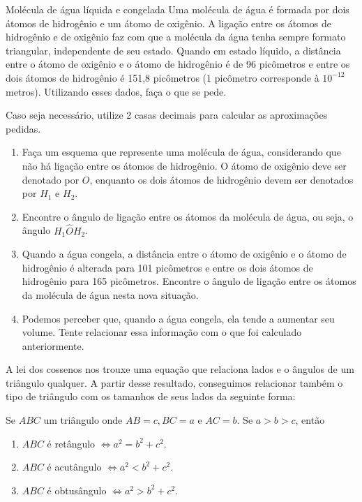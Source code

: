 \begin{task}{Molécula de água líquida e congelada}\label{sec2_leidoscossenos_atquimica}
Uma molécula de água é formada por dois átomos de hidrogênio e um átomo de oxigênio. A ligação entre os átomos de hidrogênio e de oxigênio faz com que a molécula da água tenha sempre formato triangular, independente de seu estado. Quando em estado líquido, a distância entre o átomo de oxigênio e o átomo de hidrogênio é de 96 picômetros e entre os dois átomos de hidrogênio é 151,8 picômetros ($1$ picômetro corresponde à $10^{-12}$ metros). Utilizando esses dados, faça o que se pede.

Caso seja necessário, utilize 2 casas decimais para calcular as aproximações pedidas.

\begin{enumerate}
    \item{}
    Faça um esquema que represente uma molécula de água, considerando que não há ligação entre os átomos de hidrogênio. O átomo de oxigênio deve ser denotado por $O$, enquanto os dois átomos de hidrogênio devem ser denotados por $H_1$ e $H_2$.
    
    \item{}
    Encontre o ângulo de ligação entre os átomos da molécula de água, ou seja, o ângulo $H_1\hat{O}H_2$.
    
    \item{}
    Quando a água congela, a distância entre o átomo de oxigênio e o átomo de hidrogênio é alterada para 101 picômetros e entre os dois átomos de hidrogênio para 165 picômetros. Encontre o ângulo de ligação entre os átomos da molécula de água nesta nova situação.

    \item{}
    Podemos perceber que, quando a água congela, ela tende a aumentar seu volume. Tente relacionar essa informação com o que foi calculado anteriormente.  
\end{enumerate}
\end{task}

\know{}
A lei dos cossenos nos trouxe uma equação que relaciona lados e o ângulos de um triângulo qualquer. A partir desse resultado, conseguimos relacionar também o tipo de triângulo com os tamanhos de seus lados da seguinte forma: 

Se $ABC$ um triângulo onde $AB=c, BC=a$ e $AC=b$. Se $a>b>c$, então
\begin{enumerate}
    \item{}
    $ABC$ é retângulo $\iff a^2=b^2+c^2$.
    
    \item{}
    $ABC$ é acutângulo $\iff a^2<b^2+c^2$.
    
    \item{}
    $ABC$ é obtusângulo $\iff a^2>b^2+c^2$.
\end{enumerate}

